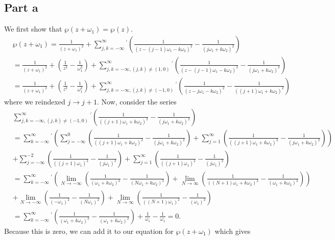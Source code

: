 \documentclass{article}
\begin{document}
\subsection{Part a}
We first show that $\wp(z+\omega_1)=\wp(z)$. 
\begin{align*}
&\wp(z+\omega_1)=\frac{1}{(z+\omega_1)^2}+\sum_{j,k=-\infty}^{\infty}{}^{'}\left( \frac{1}{(z-(j-1)\omega_1-k \omega_2)^2}-\frac{1}{(j \omega_1+k \omega_2)^2}\right)\\&=
\frac{1}{(z+\omega_1)^2}+\left(\frac{1}{z^2}-\frac{1}{\omega_1^2}\right)+\sum_{j,k=-\infty, (j,k)\neq(1,0)}^{\infty}{}^{'}\left( \frac{1}{(z-(j-1)\omega_1-k \omega_2)^2}-\frac{1}{(j \omega_1+k \omega_2)^2}\right)\\&=
\frac{1}{(z+\omega_1)^2}+\left(\frac{1}{z^2}-\frac{1}{\omega_1^2}\right)+\sum_{j,k=-\infty, (j,k)\neq(-1,0)}^{\infty}{}^{'}\left( \frac{1}{(z-j\omega_1-k \omega_2)^2}-\frac{1}{((j+1) \omega_1+k \omega_2)^2}\right)
\end{align*}
where we reindexed $j\to j+1$. Now, consider the series
\begin{align*}
&\sum_{j,k=-\infty, (j,k)\neq(-1,0)}^{\infty}{}^{'}\left( \frac{1}{((j+1) \omega_1+k \omega_2)^2}-\frac{1}{(j\omega_1+k\omega_2)^2}\right)\\&=
\sum_{k=-\infty}^{\infty}{}^{'}\left(\sum_{j=-\infty}^{0}\left( \frac{1}{((j+1) \omega_1+k \omega_2)^2}-\frac{1}{(j\omega_1+k\omega_2)^2}\right)+\sum_{j=1}^{\infty}\left( \frac{1}{((j+1) \omega_1+k \omega_2)^2}-\frac{1}{(j\omega_1+k\omega_2)^2}\right)\right)\\&+\sum_{j=-\infty}^{-2}\left( \frac{1}{((j+1) \omega_1)^2}-\frac{1}{(j\omega_1)^2}\right)+\sum_{j=1}^{\infty}\left( \frac{1}{((j+1) \omega_1)^2}-\frac{1}{(j\omega_1)^2}\right)\\&=
\sum_{k=-\infty}^{\infty}{}^{'}\left(\lim_{N\to-\infty}\left(\frac{1}{( \omega_1+k \omega_2)^2}-\frac{1}{(N\omega_1+k\omega_2)^2}\right)+\lim_{N\to\infty}\left(\frac{1}{((N+1)\omega_1+k\omega_2)^2}-\frac{1}{( \omega_1+k \omega_2)^2}\right)\right)\\&+\lim_{N\to-\infty}\left( \frac{1}{(- \omega_1)^2}-\frac{1}{(N\omega_1)^2}\right)+\lim_{N\to\infty}\left( \frac{1}{((N+1) \omega_1)^2}-\frac{1}{(\omega_1)^2}\right)\\&=
\sum_{k=-\infty}^{\infty}{}^{'}\left(\frac{1}{(\omega_1+k\omega_2)^2}-\frac{1}{(\omega_1+k\omega_2)^2}\right)+\frac{1}{\omega_1}-\frac{1}{\omega_1}=0.
\end{align*}
Because this is zero, we can add it to our equation for $\wp(z+\omega_1)$ which gives
\end{document}
